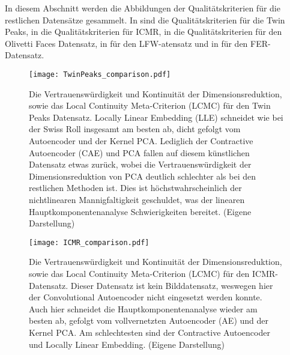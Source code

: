 In diesem Abschnitt werden die Abbildungen der Qualitätskriterien für die restlichen Datensätze
gesammelt. In  sind die Qualitätskriterien für die Twin Peaks, in
 die Qualitätskriterien für ICMR, in  die
Qualitätskriterien für den Olivetti Faces Datensatz, in  für den
LFW-atensatz und in  für den FER-Datensatz.
\begin{figure}[ht]
	\begin{center}
		\texttt{[image: TwinPeaks\_comparison.pdf]}
	\end{center}
	\caption[Qualitätskriterien für die Twin Peaks]{Die Vertrauenswürdigkeit und Kontinuität der Dimensionsreduktion, sowie das Local Continuity Meta-Criterion (LCMC) für den Twin Peaks Datensatz. Locally Linear Embedding (LLE) schneidet wie bei der Swiss Roll insgesamt am besten ab, dicht gefolgt vom Autoencoder und der Kernel PCA. Lediglich der Contractive Autoencoder (CAE) und PCA fallen auf diesem künstlichen Datensatz etwas zurück, wobei die Vertrauenswürdigkeit der Dimensionsreduktion von PCA deutlich schlechter als bei den restlichen Methoden ist. Dies ist höchstwahrscheinlich der nichtlinearen Mannigfaltigkeit geschuldet, was der linearen Hauptkomponentenanalyse Schwierigkeiten bereitet. (Eigene Darstellung)}
	\label{fig:TwinPeaksMetrics}
\end{figure}

\begin{figure}[ht]
	\begin{center}
		\texttt{[image: ICMR\_comparison.pdf]}
	\end{center}
	\caption[Qualitätskriterien für den ICMR-Datensatz]{Die Vertrauenswürdigkeit und Kontinuität der Dimensionsreduktion, sowie das Local Continuity Meta-Criterion (LCMC) für den ICMR-Datensatz. Dieser Datensatz ist kein Bilddatensatz, weswegen hier der Convolutional Autoencoder nicht eingesetzt werden konnte. Auch hier schneidet die Hauptkomponentenanalyse wieder am besten ab, gefolgt vom vollvernetzten Autoencoder (AE) und der Kernel PCA. Am schlechtesten sind der Contractive Autoencoder und Locally Linear Embedding. (Eigene Darstellung)}
	\label{fig:ICMRMetrics}
\end{figure}

